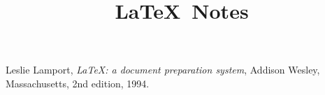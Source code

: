 \documentclass{article}
\title{\LaTeX~Notes}
\author{}
\date{}
\begin{document}
\maketitle

\begin{thebibliography}{9}

    Leslie Lamport,
    \emph{\LaTeX: a document preparation system},
    Addison Wesley, Massachusetts,
    2nd edition,
    1994.

\end{thebibliography}
\end{document}
